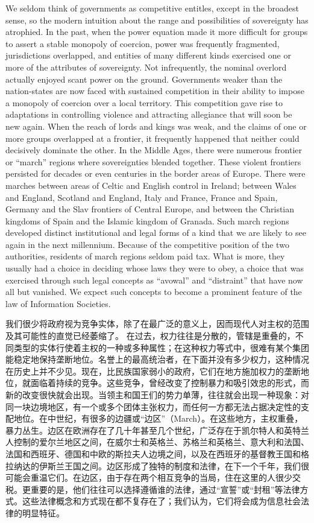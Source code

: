 \begin{paracol}{2}
	We seldom think of governments as competitive entitles, except in the broadest sense, so the modern intuition about the range and possibilities of sovereignty has atrophied. In the past, when the power equation made it more difficult for groups to assert a stable monopoly of coercion, power was frequently fragmented, jurisdictions overlapped, and entities of many different kinds exercised one or more of the attributes of sovereignty. Not infrequently, the nominal overlord actually enjoyed scant power on the ground. Governments weaker than the nation-states are now faced with sustained competition in their ability to impose a monopoly of coercion over a local territory. This competition gave rise to adaptations in controlling violence and attracting allegiance that will soon be new again.   When the reach of lords and kings was weak, and the claims of one or more groups overlapped at a frontier, it frequently happened that neither could decisively dominate the other. In the Middle Ages, there were numerous frontier or ``march'' regions where sovereignties blended together. These violent frontiers persisted for decades or even centuries in the border areas of Europe. There were marches between areas of Celtic and English control in Ireland; between Wales and England, Scotland and England, Italy and France, France and Spain, Germany and the Slav frontiers of Central Europe, and between the Christian kingdoms of Spain and the Islamic kingdom of Granada. Such march regions developed distinct institutional and legal forms of a kind that we are likely to see again in the next millennium. Because of the competitive position of the two authorities, residents of march regions seldom paid tax. What is more, they usually had a choice in deciding whose laws they were to obey, a choice that was exercised through such legal concepts as ``avowal'' and ``distraint'' that have now all but vanished. We expect such concepts to become a prominent feature of the law of Information Societies.
	
	\switchcolumn
	我们很少将政府视为竞争实体，除了在最广泛的意义上，因而现代人对主权的范围及其可能性的直觉已经萎缩了。 在过去，权力往往是分散的，管辖是重叠的，不同类型的实体行使着主权的一种或多种属性；在这种权力等式中，很难有某个集团能稳定地保持垄断地位。名誉上的最高统治者，在下面并没有多少权力，这种情况在历史上并不少见。现在，比民族国家弱小的政府，它们在地方施加权力的垄断地位，就面临着持续的竞争。这些竞争，曾经改变了控制暴力和吸引效忠的形式，而新的改变很快就会出现。当领主和国王们的势力单薄，往往就会出现一种现象：对同一块边境地区，有一个或多个团体主张权力，而任何一方都无法占据决定性的支配地位。在中世纪，有很多的边疆或“边区”（March）。在这些地方，主权重叠，暴力丛生。边区在欧洲存在了几十年甚至几个世纪，广泛存在于凯尔特人和英特兰人控制的爱尔兰地区之间，在威尔士和英格兰、苏格兰和英格兰、意大利和法国、法国和西班牙、德国和中欧的斯拉夫人边境之间，以及在西班牙的基督教王国和格拉纳达的伊斯兰王国之间。边区形成了独特的制度和法律，在下一个千年，我们很可能会重温它们。在边区，由于存在两个相互竞争的当局，住在这里的人很少交税。更重要的是，他们往往可以选择遵循谁的法律，通过“宣誓”或“封租”等法律方式。这些法律概念和方式现在都不复存在了；我们认为，它们将会成为信息社会法律的明显特征。
\end{paracol}

